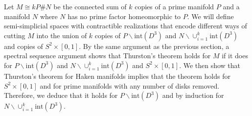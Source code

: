\documentclass[a4paper]{amsart}
\theoremstyle{definition}
\theoremstyle{remark}
\numberwithin{equation}{section}
\begin{document}
Let $M\cong kP\# N$ be the connected sum of $k$ copies of a prime manifold $P$ and a manifold $N$ where $N$ has no prime factor homeomorphic to $P$. We will define semi-simplicial spaces with contractible realizations that encode different ways of cutting $M$ into the union of $k$ copies of $P\backslash \text{int}(D^3)$  and $N\backslash \cup_{i=1}^{k}\text{int}(D^3)$ and copies of $S^2\times [0,1]$. By the same argument as the previous section, a spectral sequence argument shows that Thurston's theorem holds for $M$ if it does for $P\backslash \text{int}(D^3)$  and $N\backslash \cup_{i=1}^{k}\text{int}(D^3)$ and $S^2\times [0,1]$. We then show that Thurston's theorem for Haken manifolds implies that the theorem holds for $S^2\times [0,1]$ and for prime manifolds with any number of disks removed. Therefore, we deduce that it holds for $P\backslash \text{int}(D^3)$ and by induction for $N\backslash \cup_{i=1}^{k}\text{int}(D^3)$. 
\end{document}
